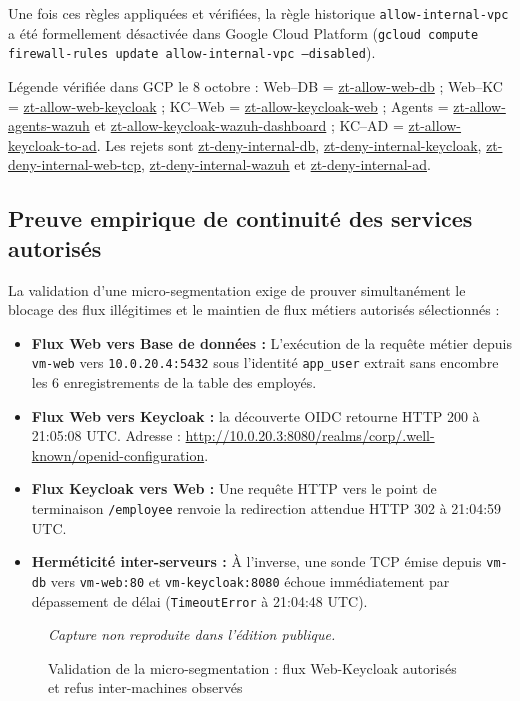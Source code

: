 \documentclass[a4paper,12pt]{report}
\newcommand{\publiccapture}[1]{%
  \begin{figure}[H]\centering
  {\footnotesize\itshape Capture non reproduite dans l'édition publique.}
  \caption{#1}\end{figure}}
\begin{document}
Une fois ces règles appliquées et vérifiées, la règle historique \texttt{allow-internal-vpc} a été formellement désactivée dans Google Cloud Platform (\texttt{gcloud compute firewall-rules update allow-internal-vpc --disabled}).

\begingroup\small\sloppy
\noindent Légende vérifiée dans GCP le 8 octobre : Web--DB = \url{zt-allow-web-db} ; Web--KC = \url{zt-allow-web-keycloak} ; KC--Web = \url{zt-allow-keycloak-web} ; Agents = \url{zt-allow-agents-wazuh} et \url{zt-allow-keycloak-wazuh-dashboard} ; KC--AD = \url{zt-allow-keycloak-to-ad}. Les rejets sont \url{zt-deny-internal-db}, \url{zt-deny-internal-keycloak}, \url{zt-deny-internal-web-tcp}, \url{zt-deny-internal-wazuh} et \url{zt-deny-internal-ad}.
\par\endgroup

\subsection{Preuve empirique de continuité des services autorisés}
La validation d'une micro-segmentation exige de prouver simultanément le blocage des flux illégitimes et le maintien de flux métiers autorisés sélectionnés :
\begin{itemize}
\item \textbf{Flux Web vers Base de données :} L'exécution de la requête métier depuis \texttt{vm-web} vers \texttt{10.0.20.4:5432} sous l'identité \texttt{app\_user} extrait sans encombre les 6 enregistrements de la table des employés.
\item \textbf{Flux Web vers Keycloak :} la découverte OIDC retourne HTTP 200 à 21:05:08 UTC. Adresse : \url{http://10.0.20.3:8080/realms/corp/.well-known/openid-configuration}.
\item \textbf{Flux Keycloak vers Web :} Une requête HTTP vers le point de terminaison \texttt{/employee} renvoie la redirection attendue HTTP 302 à 21:04:59 UTC.
\item \textbf{Herméticité inter-serveurs :} À l'inverse, une sonde TCP émise depuis \texttt{vm-db} vers \texttt{vm-web:80} et \texttt{vm-keycloak:8080} échoue immédiatement par dépassement de délai (\texttt{TimeoutError} à 21:04:48 UTC).
\end{itemize}

\publiccapture{Validation de la micro-segmentation : flux Web-Keycloak autorisés et refus inter-machines observés}
\end{document}
